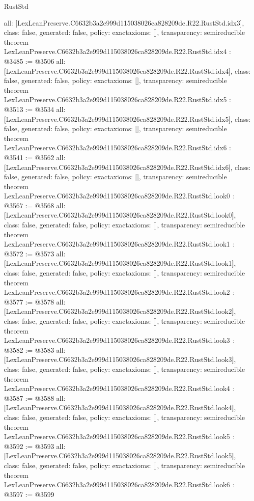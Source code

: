 \begin{lexlean}{RustStd}
\begin{coremodule}
{  all: [LexLeanPreserve.C6632b3a2e999d115038026ca828209de.R22.RustStd.idx3],
  class: false,
  generated: false,
  policy: exact{axioms: []},
  transparency: semireducible
}
theorem LexLeanPreserve.C6632b3a2e999d115038026ca828209de.R22.RustStd.idx4 : @3485 := @3506 {
  all: [LexLeanPreserve.C6632b3a2e999d115038026ca828209de.R22.RustStd.idx4],
  class: false,
  generated: false,
  policy: exact{axioms: []},
  transparency: semireducible
}
theorem LexLeanPreserve.C6632b3a2e999d115038026ca828209de.R22.RustStd.idx5 : @3513 := @3534 {
  all: [LexLeanPreserve.C6632b3a2e999d115038026ca828209de.R22.RustStd.idx5],
  class: false,
  generated: false,
  policy: exact{axioms: []},
  transparency: semireducible
}
theorem LexLeanPreserve.C6632b3a2e999d115038026ca828209de.R22.RustStd.idx6 : @3541 := @3562 {
  all: [LexLeanPreserve.C6632b3a2e999d115038026ca828209de.R22.RustStd.idx6],
  class: false,
  generated: false,
  policy: exact{axioms: []},
  transparency: semireducible
}
theorem LexLeanPreserve.C6632b3a2e999d115038026ca828209de.R22.RustStd.look0 : @3567 := @3568 {
  all: [LexLeanPreserve.C6632b3a2e999d115038026ca828209de.R22.RustStd.look0],
  class: false,
  generated: false,
  policy: exact{axioms: []},
  transparency: semireducible
}
theorem LexLeanPreserve.C6632b3a2e999d115038026ca828209de.R22.RustStd.look1 : @3572 := @3573 {
  all: [LexLeanPreserve.C6632b3a2e999d115038026ca828209de.R22.RustStd.look1],
  class: false,
  generated: false,
  policy: exact{axioms: []},
  transparency: semireducible
}
theorem LexLeanPreserve.C6632b3a2e999d115038026ca828209de.R22.RustStd.look2 : @3577 := @3578 {
  all: [LexLeanPreserve.C6632b3a2e999d115038026ca828209de.R22.RustStd.look2],
  class: false,
  generated: false,
  policy: exact{axioms: []},
  transparency: semireducible
}
theorem LexLeanPreserve.C6632b3a2e999d115038026ca828209de.R22.RustStd.look3 : @3582 := @3583 {
  all: [LexLeanPreserve.C6632b3a2e999d115038026ca828209de.R22.RustStd.look3],
  class: false,
  generated: false,
  policy: exact{axioms: []},
  transparency: semireducible
}
theorem LexLeanPreserve.C6632b3a2e999d115038026ca828209de.R22.RustStd.look4 : @3587 := @3588 {
  all: [LexLeanPreserve.C6632b3a2e999d115038026ca828209de.R22.RustStd.look4],
  class: false,
  generated: false,
  policy: exact{axioms: []},
  transparency: semireducible
}
theorem LexLeanPreserve.C6632b3a2e999d115038026ca828209de.R22.RustStd.look5 : @3592 := @3593 {
  all: [LexLeanPreserve.C6632b3a2e999d115038026ca828209de.R22.RustStd.look5],
  class: false,
  generated: false,
  policy: exact{axioms: []},
  transparency: semireducible
}
theorem LexLeanPreserve.C6632b3a2e999d115038026ca828209de.R22.RustStd.look6 : @3597 := @3599 {
}
\end{coremodule}
\end{lexlean}
